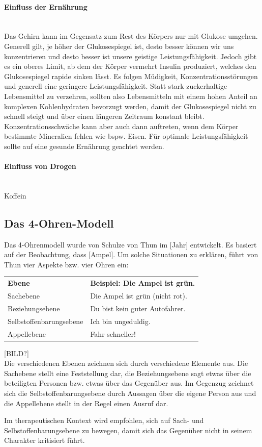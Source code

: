 \paragraph{Einfluss der Ernährung}~\\
Das Gehirn kann im Gegensatz zum Rest des Körpers nur mit Glukose umgehen. Generell gilt, je höher der Glukosespiegel ist, desto besser können wir uns konzentrieren und desto besser ist unsere geistige Leistungsfähigkeit. Jedoch gibt es ein oberes Limit, ab dem der Körper vermehrt Insulin produziert, welches den Glukosespiegel rapide sinken lässt. Es folgen Müdigkeit, Konzentrationsstörungen und generell eine geringere Leistungsfähigkeit. Statt stark zuckerhaltige Lebensmittel zu verzehren, sollten also Lebensmitteln mit einem hohen Anteil an komplexen Kohlenhydraten bevorzugt werden, damit der Glukosespiegel nicht zu schnell steigt und über einen längeren Zeitraum konstant bleibt.
Konzentrationsschwäche kann aber auch dann auftreten, wenn dem Körper bestimmte Mineralien fehlen wie bspw. Eisen. Für optimale Leistungsfähigkeit sollte auf eine gesunde Ernährung geachtet werden.
\paragraph{Einfluss von Drogen}~\\
Koffein

\subsection{Das 4-Ohren-Modell}
Das 4-Ohrenmodell wurde von Schulze von Thun im [Jahr] entwickelt. Es basiert auf der Beobachtung, dass [Ampel]. Um solche Situationen zu erklären, führt von Thun vier Aspekte bzw. vier Ohren ein:

\begin{tabular}{ll}
{\bf Ebene} & {\bf Beispiel: Die Ampel ist grün.}\\
Sachebene & Die Ampel ist grün (nicht rot).\\
Beziehungsebene & Du bist kein guter Autofahrer.\\
Selbstoffenbarungsebene & Ich bin ungeduldig.\\
Appellebene & Fahr schneller!\\
\end{tabular}

[BILD?]\\

Die verschiedenen Ebenen zeichnen sich durch verschiedene Elemente aus. Die Sachebene stellt eine Feststellung dar, die Beziehungsebene sagt etwas über die beteiligten Personen bzw. etwas über das Gegenüber aus. Im Gegenzug zeichnet sich die Selbstoffenbarungsebene durch Aussagen über die eigene Person aus und die Appellebene stellt in der Regel einen Ausruf dar.

Im therapeutischen Kontext wird empfohlen, sich auf Sach- und Selbstoffenbarungsebene zu bewegen, damit sich das Gegenüber nicht in seinem Charakter kritisiert führt.

